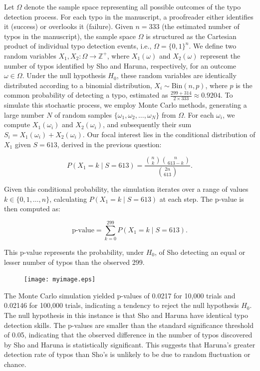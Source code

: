 \documentclass[12pt]{article}
\begin{document}
Let \(\Omega\) denote the sample space representing all possible outcomes of the typo detection process. For each typo in the manuscript, a proofreader either identifies it (success) or overlooks it (failure). Given \(n = 333\) (the estimated number of typos in the manuscript), the sample space \(\Omega\) is structured as the Cartesian product of individual typo detection events, i.e., \(\Omega = \{0,1\}^n\). We define two random variables \(X_1, X_2 : \Omega \rightarrow \mathbb{Z}^+\), where \(X_1(\omega)\) and \(X_2(\omega)\) represent the number of typos identified by Sho and Haruna, respectively, for an outcome \(\omega \in \Omega\). Under the null hypothesis \(H_0\), these random variables are identically distributed according to a binomial distribution, \(X_i \sim \text{Bin}(n, p)\), where \(p\) is the common probability of detecting a typo, estimated as \(\frac{299 + 314}{2 \times 333} \approx 0.9204\). To simulate this stochastic process, we employ Monte Carlo methods, generating a large number \(N\) of random samples \(\{\omega_1, \omega_2, \ldots, \omega_N\}\) from \(\Omega\). For each \(\omega_i\), we compute \(X_1(\omega_i)\) and \(X_2(\omega_i)\), and subsequently their sum \(S_i = X_1(\omega_i) + X_2(\omega_i)\). Our focal interest lies in the conditional distribution of \(X_1\) given \(S = 613\), derived in the previous question:

\[ P(X_1 = k \mid S = 613) = \frac{\binom{n}{k} \binom{n}{613 - k}}{\binom{2n}{613}}. \]

Given this conditional probability, the simulation iterates over a range of values \(k \in \{0, 1, \ldots, n\}\), calculating \(P(X_1 = k \mid S = 613)\) at each step. The p-value is then computed as:

\[ \text{p-value} = \sum_{k=0}^{299} P(X_1 = k \mid S = 613). \]

This p-value represents the probability, under \(H_0\), of Sho detecting an equal or lesser number of typos than the observed 299.



\begin{figure}[ht!]
    \centering
    \texttt{[image: myimage.eps]}
    \caption{}
    \label{fig:enter-label}
\end{figure}


The Monte Carlo simulation yielded p-values of 0.0217 for 10,000 trials and 0.02146 for 100,000 trials, indicating a tendency to reject the null hypothesis \(H_0\). The null hypothesis in this instance is that Sho and Haruna have identical typo detection skills. The p-values are smaller than the standard significance threshold of 0.05, indicating that the observed difference in the number of typos discovered by Sho and Haruna is statistically significant. This suggests that Haruna's greater detection rate of typos than Sho's is unlikely to be due to random fluctuation or chance.
\end{document}
